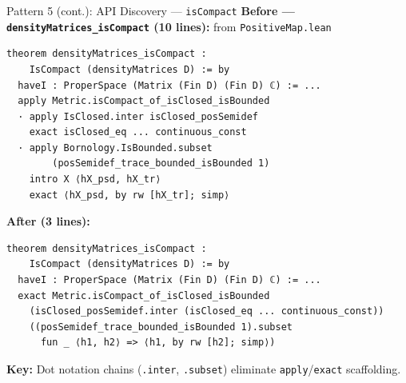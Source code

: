 \documentclass[aspectratio=169,10pt]{beamer}
\begin{document}
\begin{frame}[fragile]{Pattern 5 (cont.): API Discovery --- \texttt{isCompact}}
    \vspace{-0.3em}
    \textbf{\textcolor{softred}{Before} --- \texttt{densityMatrices\_isCompact} (10 lines):}
    {\small from \texttt{PositiveMap.lean}}
    \begin{lstlisting}[basicstyle=\ttfamily\fontsize{5.5pt}{6.5pt}\selectfont\color{white}]
theorem densityMatrices_isCompact :
    IsCompact (densityMatrices D) := by
  haveI : ProperSpace (Matrix (Fin D) (Fin D) ℂ) := ...
  apply Metric.isCompact_of_isClosed_isBounded
  · apply IsClosed.inter isClosed_posSemidef
    exact isClosed_eq ... continuous_const
  · apply Bornology.IsBounded.subset
        (posSemidef_trace_bounded_isBounded 1)
    intro X ⟨hX_psd, hX_tr⟩
    exact ⟨hX_psd, by rw [hX_tr]; simp⟩
    \end{lstlisting}

    \textbf{\textcolor{leangreen}{After} (3 lines):}
    \begin{lstlisting}[basicstyle=\ttfamily\fontsize{5.5pt}{6.5pt}\selectfont\color{white}]
theorem densityMatrices_isCompact :
    IsCompact (densityMatrices D) := by
  haveI : ProperSpace (Matrix (Fin D) (Fin D) ℂ) := ...
  exact Metric.isCompact_of_isClosed_isBounded
    (isClosed_posSemidef.inter (isClosed_eq ... continuous_const))
    ((posSemidef_trace_bounded_isBounded 1).subset
      fun _ ⟨h1, h2⟩ => ⟨h1, by rw [h2]; simp⟩)
    \end{lstlisting}

    {\small \textbf{Key:} Dot notation chains (\texttt{.inter}, \texttt{.subset}) eliminate \texttt{apply}/\texttt{exact} scaffolding.}
\end{frame}
\end{document}
